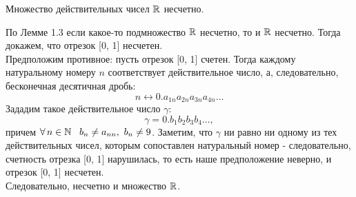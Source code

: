 \begin{theorem}
    Множество действительных чисел \(\mathbb{R}\) несчетно.

    \vspace{2mm}
    
    По Лемме 1.3 если какое-то подмножество \(\mathbb{R}\) несчетно, то и \(\mathbb{R}\) несчетно.
    Тогда докажем, что отрезок [0, 1] несчетен. \\
    Предположим противное: пусть отрезок [0, 1] счетен. Тогда каждому натуральному номеру \(n\)
    соответствует действительное число, а, следовательно, бесконечная десятичная дробь:
    \[n \longleftrightarrow 0.a_{1n}a_{2n}a_{3n}a_{4n}\dots\]
    Зададим такое действительное число \(\gamma\):
    \[\gamma = 0.b_{1}b_{2}b_{3}b_{4}\dots,\]
    причем \(\forall\,n\in\mathbb{N}\hspace{3mm} b_{n}\neq a_{nn},~ b_{n} \neq 9\).
    Заметим, что \(\gamma\) ни равно ни одному из тех действительных чисел, 
    которым сопоставлен натуральный номер - следовательно, счетность отрезка [0, 1]
    нарушилась, то есть наше предположение неверно, и отрезок [0, 1] несчетен.\\
    Следовательно, несчетно и множество \(\mathbb{R}\).
\end{theorem}
